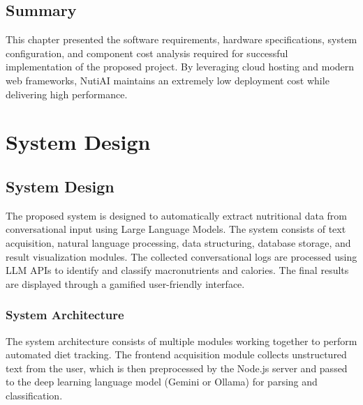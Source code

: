 \documentclass[12pt,a4paper]{report}
\begin{document}
\section{Summary}
This chapter presented the software requirements, hardware specifications, system configuration, and component cost analysis required for successful implementation of the proposed project. By leveraging cloud hosting and modern web frameworks, NutiAI maintains an extremely low deployment cost while delivering high performance.


\chapter{System Design}

\section{System Design}
The proposed system is designed to automatically extract nutritional data from conversational input using Large Language Models. The system consists of text acquisition, natural language processing, data structuring, database storage, and result visualization modules. The collected conversational logs are processed using LLM APIs to identify and classify macronutrients and calories. The final results are displayed through a gamified user-friendly interface.

\subsection{System Architecture}
The system architecture consists of multiple modules working together to perform automated diet tracking. The frontend acquisition module collects unstructured text from the user, which is then preprocessed by the Node.js server and passed to the deep learning language model (Gemini or Ollama) for parsing and classification.
\end{document}
